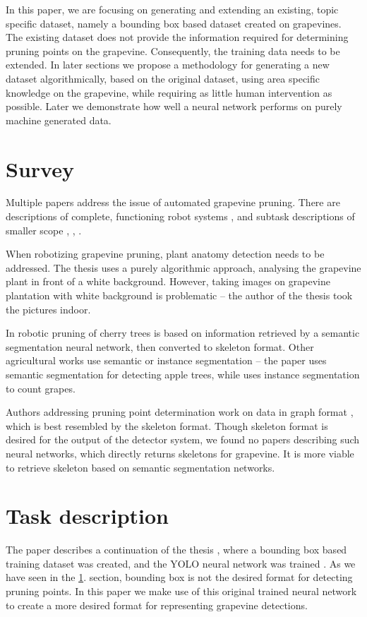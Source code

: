 \documentclass{PSAIE}%
\begin{document}
In this paper, we are focusing on generating and extending an existing, topic specific dataset, namely
a bounding box based dataset created on grapevines. The existing dataset does not provide the information
required for determining pruning points on the grapevine. Consequently, the training data needs to be
extended. In later sections we propose a methodology for generating a new dataset algorithmically, based on
the original dataset, using area specific knowledge on the grapevine, while requiring as little human
intervention as possible. Later we demonstrate how well a neural network performs on purely machine
generated data.

\section{Survey} \label{sec_survey}
Multiple papers address the issue of automated grapevine pruning. There are descriptions of complete,
functioning robot systems \cite{botterill2017robot}, and subtask descriptions of smaller scope
\cite{goesmannai}, \cite{fernandes2021grapevine}, \cite{katyara2020reproducible}.

When robotizing grapevine pruning, plant anatomy detection needs to be addressed. The thesis
\cite{white_background_grape} uses a purely algorithmic approach, analysing the grapevine plant
in front of a white background. However, taking images on grapevine plantation with white background
is problematic -- the author of the thesis took the pictures indoor.

In \cite{you2021semantics} robotic pruning of cherry trees is based on information retrieved by a
semantic segmentation neural network, then converted to skeleton format. Other
agricultural works use semantic or instance segmentation -- the paper \cite{chen2021semantic} uses semantic
segmentation for detecting apple trees, while \cite{santos2020grape} uses instance segmentation to count
grapes.

Authors addressing pruning point determination work on data in graph format \cite{goesmannai}, which is best
resembled by the skeleton format. Though skeleton format is desired for the output of the detector system,
we found no papers describing such neural networks, which directly returns skeletons for grapevine.
It is more viable to retrieve skeleton based on \cite{you2021semantics} semantic segmentation networks.

\section{Task description} \label{sec_task_description}
The paper describes a continuation of the thesis \cite{bolyki_2021}, where a bounding box based training
dataset was created, and the YOLO neural network was trained \cite{glenn_jocher_2021_5563715}. As we have
seen in the \ref{sec_survey}. section, bounding box is not the desired format for detecting pruning points.
In this paper we make use of this original trained neural network to create a more desired format for
representing grapevine detections.
\end{document}
